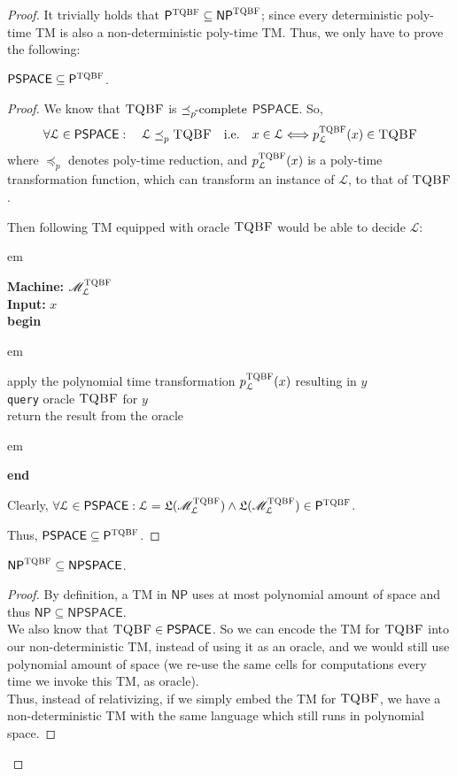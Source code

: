 \documentclass[usletter]{article}
\newcommand {\langset}[1]      {\ensuremath{\mathcal{#1}}}
\newcommand {\machine}[1]      {\ensuremath{\mathscr{#1}}}
\newcommand {\langfunc}        {\ensuremath{\mathfrak{L}}}
\newcommand {\namedlangset}[1] {\ensuremath{\textnormal{\textsc{#1}}}}
\newcommand {\family}[1]       {\ensuremath{\mathsf{#1}}}
\newcommand {\reduce}[2]    {\ensuremath{\preceq_{#1}^{#2}}}
\newcommand {\complete}[2]  {\ensuremath{\reduce{#1}{#2}     %
                                         \hspace*{-4pt}\textnormal{-complete}}}
\newcommand {\indpar}[1]   {
  \par\leftskip=#1em
  \noindent\ignorespaces
}
\newenvironment{turing}[2] {
  \smallskip
  \indpar{2}
  \textbf{Machine:} #1\\
  \textbf{Input:} $#2$\\[5pt]
  \textbf{begin}
  \parskip=0pt
  \indpar{3}
}{
  \indpar{2}
  \textbf{end}
  \par\medskip
}
\newcommand{\ie}{\textnormal{i.e.}}
\newcommand {\langL}          {\langset{L}}
\newcommand {\machineM}       {\machine{M}}
\begin{document}
\begin{enumerate}
\begin{proof}
    It trivially holds that
    $\family{P}^\namedlangset{TQBF} \subseteq \family{NP}^\namedlangset{TQBF}$;
    since every deterministic poly-time TM is also a non-deterministic poly-time
    TM. Thus, we only have to prove the following:

    \begin{claim}
      $ \family{PSPACE} \subseteq \family{P}^\namedlangset{TQBF} $.
    \end{claim}
    \begin{proof}
      We know that \namedlangset{TQBF} is \complete{p}{} \family{PSPACE}. So,
      $$
      \forall \langL \in \family{PSPACE} : \quad
      \langL \reduce{p}{} \namedlangset{TQBF} \quad \ie \quad
        x \in \langL \Longleftrightarrow p_\langL^\namedlangset{TQBF} (x)
                                         \in \namedlangset{TQBF}
      $$
      where \reduce{p}{} denotes poly-time reduction, and
      $p_\langL^\namedlangset{TQBF} (x)$ is a poly-time transformation function,
      which can transform an instance of \langL, to that of \namedlangset{TQBF}.

      Then following TM equipped with oracle \namedlangset{TQBF} would be able
      to decide \langL:
      \begin{turing}{$\machineM_\langL^\namedlangset{TQBF}$}{x}
        apply the polynomial time transformation
          $p_\langL^\namedlangset{TQBF}(x)$ resulting in $y$ \\
        \texttt{query} oracle \namedlangset{TQBF} for $y$ \\
        return the result from the oracle
      \end{turing}
      Clearly,
      $\forall \langL \in \family{PSPACE} :
        \langL = \langfunc(\machineM_\langL^\namedlangset{TQBF})
        \wedge \langfunc(\machineM_\langL^\namedlangset{TQBF})
          \in \family{P}^\namedlangset{TQBF}$.

      Thus, $\family{PSPACE} \subseteq \family{P}^\namedlangset{TQBF}$.
    \end{proof}

    \begin{claim}
      $ \family{NP}^\namedlangset{TQBF} \subseteq \family{NPSPACE} $.
    \end{claim}
    \begin{proof}
      By definition, a TM in \family{NP} uses at most polynomial amount of space
      and thus $\family{NP} \subseteq \family{NPSPACE}$. \\
      We also know that $\namedlangset{TQBF} \in \family{PSPACE}$. So we can
      encode the TM for \namedlangset{TQBF} into our non-deterministic TM,
      instead of using it as an oracle, and we would still use polynomial amount
      of space (we re-use the same cells for computations every time we invoke
      this TM, as oracle). \\
      Thus, instead of relativizing, if we simply embed the TM for
      \namedlangset{TQBF}, we have a non-deterministic TM with the same language
      which still runs in polynomial space.
    \end{proof}


\end{proof}
\end{enumerate}
\end{document}
